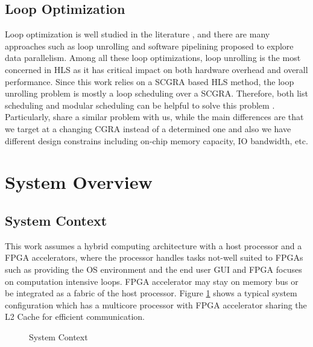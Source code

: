 \documentclass[12pt]{article} %
\begin{document}
\subsection{Loop Optimization}
Loop optimization is well studied in the literature \cite{c-to-coram} \cite{loop-unrolling-roccc}
\cite{polytope}, and there are many approaches such as loop unrolling and software pipelining
proposed to explore data parallelism. Among all these loop optimizations, loop unrolling is the most
concerned in HLS as it has critical impact on both hardware overhead and overall performance. Since
this work relies on a SCGRA based HLS method, the loop unrolling problem is mostly a loop scheduling
over a SCGRA. Therefore, both list scheduling and modular scheduling can be helpful to solve this
problem \cite{modular-scheduling} \cite{list-scheduling}. Particularly, \cite{loop-unrolling-cgra} 
\cite{loop-unrolling-shifting} share a similar problem with us, while the main differences are that we
target at a changing CGRA instead of a determined one and also we have different design constrains
including on-chip memory capacity, IO bandwidth, etc.

\section{System Overview}
\subsection{System Context}
This work assumes a hybrid computing architecture with a host processor and a FPGA accelerators,
where the processor handles tasks not-well suited to FPGAs such as providing the OS environment and
the end user GUI and FPGA focuses on computation intensive loops. FPGA accelerator may stay on memory 
bus or be integrated as a fabric of the host processor. Figure \ref{fig:system-context} shows a 
typical system configuration which has a multicore processor with FPGA accelerator sharing the 
L2 Cache for efficient communication.
\begin{figure}[H]
\caption{System Context}
\label{fig:system-context}
\end{figure}
\end{document}

